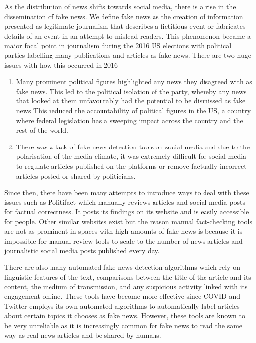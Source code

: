 \documentclass{article}
\begin{document}

As the distribution of news shifts towards social media, there is a rise in the dissemination of fake news. We define fake news as the creation of information presented as legitimate journalism that describes a fictitious event or fabricates details of an event in an attempt to mislead readers. This phenomenon became a major focal point in journalism during the 2016 US elections with political parties labelling many publications and articles as fake news. There are two huge issues with how this occurred in 2016

\begin{enumerate}
  \item Many prominent political figures highlighted any news they disagreed with as fake news. This led to the political isolation of the party, whereby any news that looked at them unfavourably had the potential to be dismissed as fake news This reduced the accountability of political figures in the US, a country where federal legislation has a sweeping impact across the country and the rest of the world.
  \item There was a lack of fake news detection tools on social media and due to the polarisation of the media climate, it was extremely difficult for social media to regulate articles published on the platforms or remove factually incorrect articles posted or shared by politicians.
\end{enumerate}

Since then, there have been many attempts to introduce ways to deal with these issues such as Politifact which manually reviews articles and social media posts for factual correctness. It posts its findings on its website and is easily accessible for people. Other similar websites exist but the reason manual fact-checking tools are not as prominent in spaces with high amounts of fake news is because it is impossible for manual review tools to scale to the number of news articles and journalistic social media posts published every day.

There are also many automated fake news detection algorithms which rely on linguistic features of the text, comparisons between the title of the article and its content, the medium of transmission, and any suspicious activity linked with its engagement online. These tools have become more effective since COVID and Twitter employs its own automated algorithms to automatically label articles about certain topics it chooses as fake news. However, these tools are known to be very unreliable as it is increasingly common for fake news to read the same way as real news articles and be shared by humans.
\end{document}
